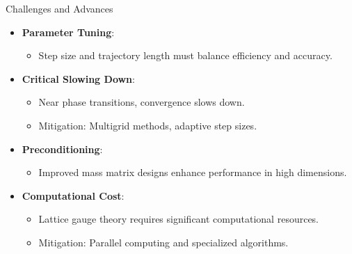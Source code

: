 \documentclass{beamer}
\begin{document}
\begin{frame}{Challenges and Advances}
  \begin{itemize}
      \item \textbf{Parameter Tuning}:
      \begin{itemize}
          \item Step size and trajectory length must balance efficiency and accuracy.
      \end{itemize}
      \item \textbf{Critical Slowing Down}:
      \begin{itemize}
          \item Near phase transitions, convergence slows down.
          \item Mitigation: Multigrid methods, adaptive step sizes.
      \end{itemize}
      \item \textbf{Preconditioning}:
      \begin{itemize}
          \item Improved mass matrix designs enhance performance in high dimensions.
      \end{itemize}
      \item \textbf{Computational Cost}:
      \begin{itemize}
          \item Lattice gauge theory requires significant computational resources.
          \item Mitigation: Parallel computing and specialized algorithms.
      \end{itemize}
  \end{itemize}
\end{frame}
\end{document}

